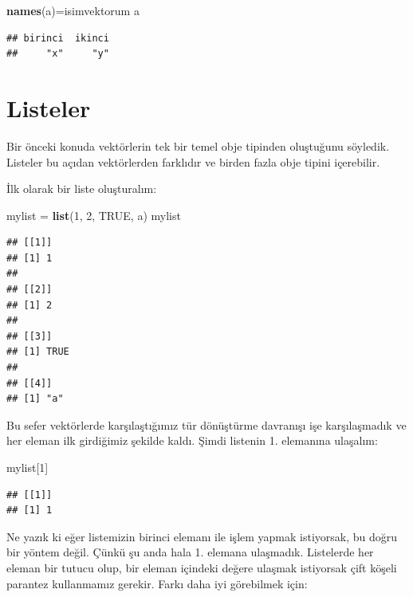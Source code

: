 \documentclass[
]{book}
\newenvironment{Shaded}{\begin{snugshade}}{\end{snugshade}}
\newcommand{\DecValTok}[1]{\textcolor[rgb]{0.00,0.00,0.81}{#1}}
\newcommand{\KeywordTok}[1]{\textcolor[rgb]{0.13,0.29,0.53}{\textbf{#1}}}
\newcommand{\NormalTok}[1]{#1}
\newcommand{\OtherTok}[1]{\textcolor[rgb]{0.56,0.35,0.01}{#1}}
\newcommand{\StringTok}[1]{\textcolor[rgb]{0.31,0.60,0.02}{#1}}
\begin{document}
\begin{Shaded}
\begin{Highlighting}[]
\KeywordTok{names}\NormalTok{(a)=isimvektorum}
\NormalTok{a}
\end{Highlighting}
\end{Shaded}

\begin{verbatim}
## birinci  ikinci 
##     "x"     "y"
\end{verbatim}

\hypertarget{listeler}{%
\chapter{Listeler}\label{listeler}}

Bir önceki konuda vektörlerin tek bir temel obje tipinden oluştuğunu söyledik. Listeler bu açıdan vektörlerden farklıdır ve birden fazla obje tipini içerebilir.

İlk olarak bir liste oluşturalım:

\begin{Shaded}
\begin{Highlighting}[]
\NormalTok{mylist =}\StringTok{ }\KeywordTok{list}\NormalTok{(}\DecValTok{1}\NormalTok{, }\DecValTok{2}\NormalTok{, }\OtherTok{TRUE}\NormalTok{, }\StringTok{\textquotesingle{}a\textquotesingle{}}\NormalTok{)}
\NormalTok{mylist}
\end{Highlighting}
\end{Shaded}

\begin{verbatim}
## [[1]]
## [1] 1
## 
## [[2]]
## [1] 2
## 
## [[3]]
## [1] TRUE
## 
## [[4]]
## [1] "a"
\end{verbatim}

Bu sefer vektörlerde karşılaştığımız tür dönüştürme davranışı işe karşılaşmadık ve her eleman ilk girdiğimiz şekilde kaldı. Şimdi listenin 1. elemanına ulaşalım:

\begin{Shaded}
\begin{Highlighting}[]
\NormalTok{mylist[}\DecValTok{1}\NormalTok{]}
\end{Highlighting}
\end{Shaded}

\begin{verbatim}
## [[1]]
## [1] 1
\end{verbatim}

Ne yazık ki eğer listemizin birinci elemanı ile işlem yapmak istiyorsak, bu doğru bir yöntem değil. Çünkü şu anda hala 1. elemana ulaşmadık. Listelerde her eleman bir tutucu olup, bir eleman içindeki değere ulaşmak istiyorsak çift köşeli parantez kullanmamız gerekir. Farkı daha iyi görebilmek için:
\end{document}
